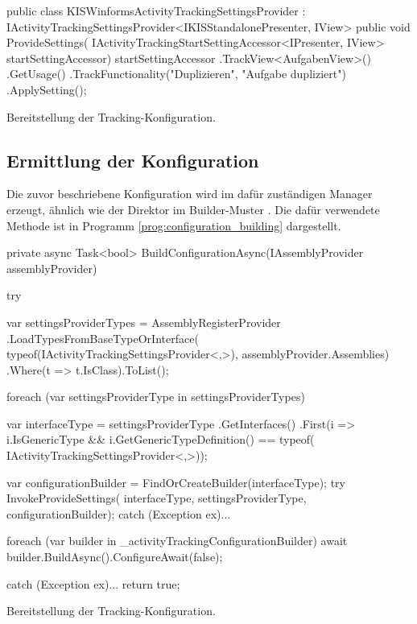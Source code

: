 \begin{program}[H]
\begin{CsCode}
public class KISWinformsActivityTrackingSettingsProvider 
    : IActivityTrackingSettingsProvider<IKISStandalonePresenter, IView>
{
    public void ProvideSettings(
        IActivityTrackingStartSettingAccessor<IPresenter, IView> startSettingAccessor)
    {
        startSettingAccessor
            .TrackView<AufgabenView>()
            .GetUsage()
            .TrackFunctionality("Duplizieren", "Aufgabe dupliziert")
            .ApplySetting();
    }
}
\end{CsCode}
\caption{Bereitstellung der Tracking-Konfiguration.}
\label{prog:settings_provider}
\end{program}

\subsection{Ermittlung der Konfiguration}

Die zuvor beschriebene Konfiguration wird im dafür zuständigen Manager erzeugt, ähnlich wie der Direktor im Builder-Muster \cite{gamma1995design}. Die dafür verwendete Methode ist in Programm \ref{prog:configuration_building} dargestellt.

\begin{program}[H]
\begin{CsCode}
private async Task<bool> BuildConfigurationAsync(IAssemblyProvider assemblyProvider)
{
    try
    {
        var settingsProviderTypes = AssemblyRegisterProvider
                .LoadTypesFromBaseTypeOrInterface(
                    typeof(IActivityTrackingSettingsProvider<,>), 
                    assemblyProvider.Assemblies)
                .Where(t => t.IsClass).ToList();

        foreach (var settingsProviderType in settingsProviderTypes)
        {
            var interfaceType = settingsProviderType
                .GetInterfaces()
                .First(i => i.IsGenericType && 
                            i.GetGenericTypeDefinition() == typeof(
                                IActivityTrackingSettingsProvider<,>));

            var configurationBuilder = FindOrCreateBuilder(interfaceType);
            try
            {
                InvokeProvideSettings(
                    interfaceType, settingsProviderType, configurationBuilder);
            } catch (Exception ex){...}
        }
        foreach (var builder in _activityTrackingConfigurationBuilder)
            await builder.BuildAsync().ConfigureAwait(false);
    } catch (Exception ex){...}
    return true;
}
\end{CsCode}
\caption{Bereitstellung der Tracking-Konfiguration.}
\label{prog:configuration_building}
\end{program}

